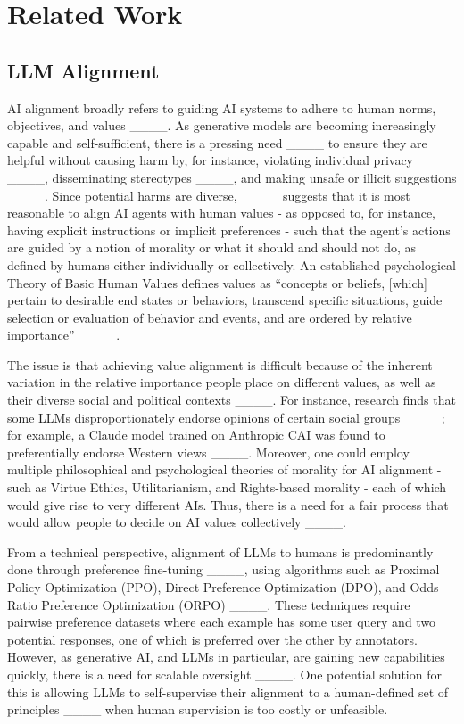 \section{Related Work}
\subsection{LLM Alignment}
AI alignment broadly refers to guiding AI systems to adhere to human norms, objectives, and values ____. As generative models are becoming increasingly capable and self-sufficient, there is a pressing need ____ to ensure they are helpful without causing harm by, for instance, violating individual privacy ____, disseminating stereotypes ____, and making unsafe or illicit suggestions ____. Since potential harms are diverse, ____ suggests that it is most reasonable to align AI agents with human values  - as opposed to, for instance, having explicit instructions or implicit preferences - such that the agent's actions are guided by a notion of morality or what it should and should not do, as defined by humans either individually or collectively. An established psychological  Theory of Basic Human Values defines values as ``concepts or beliefs, [which] pertain to desirable end states or 
behaviors, transcend specific situations, guide selection or evaluation of 
behavior and events, and are ordered by relative importance'' ____. 

The issue is that achieving value alignment is difficult because of the inherent variation in the relative importance people place on different values, as well as their diverse social and political contexts ____. For instance, research finds that some LLMs disproportionately endorse opinions of certain social groups ____; for example, a Claude model  trained on Anthropic CAI was found to preferentially endorse Western views ____. Moreover, one could employ multiple philosophical and psychological theories of morality for AI alignment - such as Virtue Ethics, Utilitarianism, and Rights-based morality - each of which would give rise to very different AIs. Thus, there is a need for a fair process that would allow people to decide on AI values collectively ____.

From a technical perspective, alignment of LLMs to humans is predominantly done through preference fine-tuning ____, using algorithms such as Proximal Policy Optimization (PPO), Direct Preference Optimization (DPO), and Odds Ratio Preference Optimization (ORPO) ____. These techniques require pairwise preference datasets where each example has some user query and two potential responses, one of which is preferred over the other by annotators. However, as generative AI, and LLMs in particular, are gaining new capabilities quickly, there is a need for scalable oversight ____. One potential solution for this is allowing LLMs to self-supervise their alignment to a human-defined set of principles ____ when human supervision is too costly or unfeasible. 

